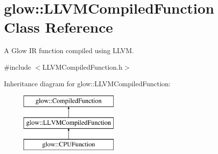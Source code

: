 \hypertarget{classglow_1_1_l_l_v_m_compiled_function}{}\section{glow\+:\+:L\+L\+V\+M\+Compiled\+Function Class Reference}
\label{classglow_1_1_l_l_v_m_compiled_function}


A Glow IR function compiled using L\+L\+VM.  




{\ttfamily \#include $<$L\+L\+V\+M\+Compiled\+Function.\+h$>$}

Inheritance diagram for glow\+:\+:L\+L\+V\+M\+Compiled\+Function\+:\begin{figure}[H]
\begin{center}
\leavevmode
\includegraphics[height=3.000000cm]{classglow_1_1_l_l_v_m_compiled_function}
\end{center}
\end{figure}
